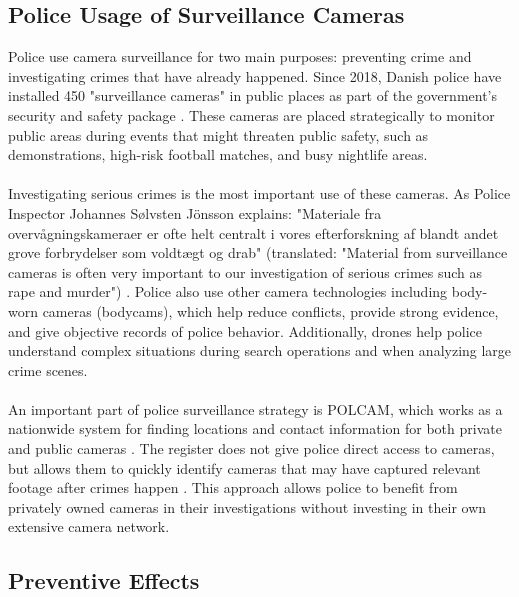 \subsection{Police Usage of Surveillance Cameras}
\label{subsec:Police_Application}

Police use camera surveillance for two main purposes: preventing crime and investigating crimes that have already happened. Since 2018, Danish police have installed 450 "surveillance cameras" in public places as part of the government's security and safety package \cite{overvagningsekspert2025,videnskab2024}. These cameras are placed strategically to monitor public areas during events that might threaten public safety, such as demonstrations, high-risk football matches, and busy nightlife areas. \cite{dyhrberg2024natteliv}
\\\\
Investigating serious crimes is the most important use of these cameras. As Police Inspector Johannes Sølvsten Jönsson explains: "Materiale fra overvågningskameraer er ofte helt centralt i vores efterforskning af blandt andet grove forbrydelser som voldtægt og drab" (translated: "Material from surveillance cameras is often very important to our investigation of serious crimes such as rape and murder") \cite{politiet2024opfordrer}. Police also use other camera technologies including body-worn cameras (bodycams), which help reduce conflicts, provide strong evidence, and give objective records of police behavior. Additionally, drones help police understand complex situations during search operations and when analyzing large crime scenes.
\\\\
An important part of police surveillance strategy is \ac{POLCAM}, which works as a nationwide system for finding locations and contact information for both private and public cameras \cite{politiet2024registrer,sikkerhedsbranchen2024,securitas2024guide}. The register does not give police direct access to cameras, but allows them to quickly identify cameras that may have captured relevant footage after crimes happen \cite{politiet2024opfordrer}. This approach allows police to benefit from privately owned cameras in their investigations without investing in their own extensive camera network. 


\subsection{Preventive Effects}
\label{subsec:preventive_effects}

